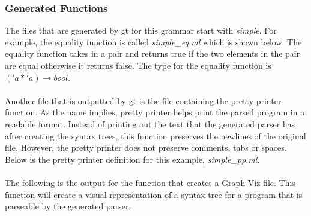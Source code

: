 \subsubsection{Generated Functions}
The files that are generated by gt for this grammar start with \textit{simple}. For example, the equality function
is called \textit{simple\_eq.ml} which is shown below. The equality function takes in a 
pair and returns true if the two elements in the pair are equal otherwise it returns false. The type for the equality 
function is $ ('a * 'a) \rightarrow bool $. \\
\ \\
%
%
\noindent Another file that is outputted by gt is the file containing the pretty printer function.
As the name implies, pretty printer helps print the parsed program in a readable format. Instead of
printing out the text that the generated parser has after creating the syntax trees, this function 
preserves the newlines of the original file. However, the pretty printer does not preserve 
comments, tabs or spaces. Below is the pretty printer definition for this example, \textit{simple\_pp.ml}.\\
%
%
\ \\
\noindent The following is the output for the function that creates a Graph-Viz file. This function
will create a visual representation of a syntax tree for a program that is parseable by the generated 
parser. \\
